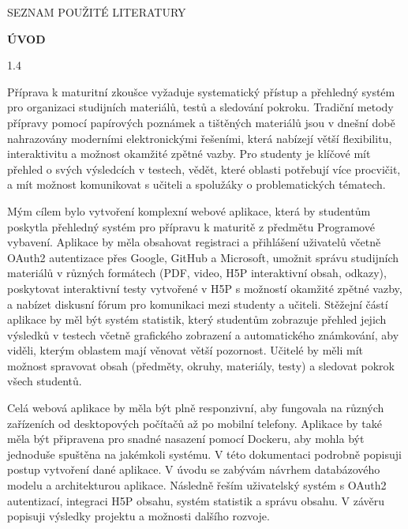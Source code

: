 \documentclass[a4paper,12pt]{article}
\begin{document}
\vspace{0.5cm}

\noindent
SEZNAM POUŽITÉ LITERATURY 

\newpage
\pagestyle{plain}
\setcounter{page}{5}

{\fontsize{18}{22}\selectfont\textbf{ÚVOD}}

\vspace{0.5cm}

\begin{spacing}{1.4}
\fontsize{12}{16}\selectfont

Příprava k maturitní zkoušce vyžaduje systematický přístup a přehledný systém pro organizaci studijních materiálů, testů a sledování pokroku. Tradiční metody přípravy pomocí papírových poznámek a tištěných materiálů jsou v dnešní době nahrazovány moderními elektronickými řešeními, která nabízejí větší flexibilitu, interaktivitu a možnost okamžité zpětné vazby. Pro studenty je klíčové mít přehled o svých výsledcích v testech, vědět, které oblasti potřebují více procvičit, a mít možnost komunikovat s učiteli a spolužáky o problematických tématech.

\vspace{0.3cm}

Mým cílem bylo vytvoření komplexní webové aplikace, která by studentům poskytla přehledný systém pro přípravu k maturitě z předmětu Programové vybavení. Aplikace by měla obsahovat registraci a přihlášení uživatelů včetně OAuth2 autentizace přes Google, GitHub a Microsoft, umožnit správu studijních materiálů v různých formátech (PDF, video, H5P interaktivní obsah, odkazy), poskytovat interaktivní testy vytvořené v H5P s možností okamžité zpětné vazby, a nabízet diskusní fórum pro komunikaci mezi studenty a učiteli. Stěžejní částí aplikace by měl být systém statistik, který studentům zobrazuje přehled jejich výsledků v testech včetně grafického zobrazení a automatického známkování, aby viděli, kterým oblastem mají věnovat větší pozornost. Učitelé by měli mít možnost spravovat obsah (předměty, okruhy, materiály, testy) a sledovat pokrok všech studentů.

\vspace{0.3cm}

Celá webová aplikace by měla být plně responzivní, aby fungovala na různých zařízeních od desktopových počítačů až po mobilní telefony. Aplikace by také měla být připravena pro snadné nasazení pomocí Dockeru, aby mohla být jednoduše spuštěna na jakémkoli systému. V této dokumentaci podrobně popisuji postup vytvoření dané aplikace. V úvodu se zabývám návrhem databázového modelu a architekturou aplikace. Následně řeším uživatelský systém s OAuth2 autentizací, integraci H5P obsahu, systém statistik a správu obsahu. V závěru popisuji výsledky projektu a možnosti dalšího rozvoje.

\end{spacing}
\end{document}
